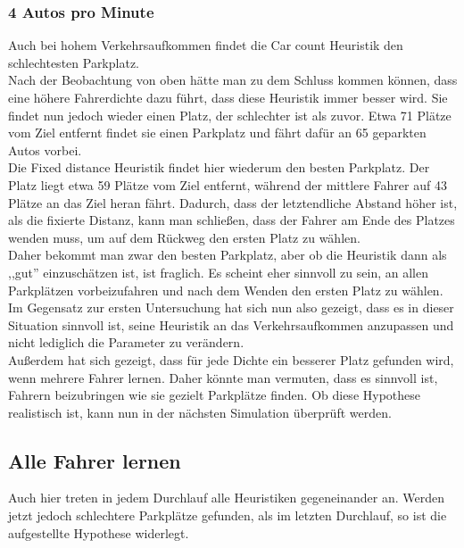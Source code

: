 \subsubsection{4 Autos pro Minute}

Auch bei hohem Verkehrsaufkommen findet die Car count Heuristik den schlechtesten Parkplatz. \\
Nach der Beobachtung von oben hätte man zu dem Schluss kommen können, dass eine höhere Fahrerdichte dazu führt, dass diese Heuristik immer besser wird. Sie findet nun jedoch wieder einen Platz, der schlechter ist als zuvor. Etwa 71 Plätze vom Ziel entfernt findet sie einen Parkplatz und fährt dafür an 65 geparkten Autos vorbei.\\
Die Fixed distance Heuristik findet hier wiederum den besten Parkplatz. 
Der Platz liegt etwa 59 Plätze vom Ziel entfernt, während der mittlere Fahrer auf 43 Plätze an das Ziel heran fährt. Dadurch, dass der letztendliche Abstand höher ist, als die fixierte Distanz, kann man schließen, dass der Fahrer am Ende des Platzes wenden muss, um auf dem Rückweg den ersten Platz zu wählen.\\
  Daher bekommt man zwar den besten Parkplatz, aber ob die Heuristik dann als ,,gut'' einzuschätzen ist, ist fraglich. Es scheint eher sinnvoll zu sein, an allen Parkplätzen vorbeizufahren und nach dem Wenden den ersten Platz zu wählen. \\
  
  Im Gegensatz zur ersten Untersuchung hat sich nun also gezeigt, dass es in dieser Situation sinnvoll ist, seine Heuristik an das Verkehrsaufkommen anzupassen und nicht lediglich die Parameter zu verändern.\\
  Außerdem hat sich gezeigt, dass für jede Dichte ein besserer Platz gefunden wird, wenn mehrere Fahrer lernen. Daher könnte man vermuten, dass es sinnvoll ist, Fahrern beizubringen wie sie gezielt Parkplätze finden. Ob diese Hypothese realistisch ist, kann nun in der nächsten Simulation überprüft werden. 
  
  \subsection{Alle Fahrer lernen}
  
Auch hier treten in jedem Durchlauf alle Heuristiken gegeneinander an. Werden jetzt jedoch schlechtere Parkplätze gefunden, als im letzten Durchlauf, so ist die aufgestellte Hypothese widerlegt.

